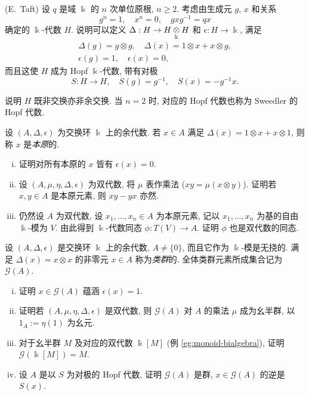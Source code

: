 \begin{Exercises}
	\item (E.\ Taft) 设 $q$ 是域 $\Bbbk$ 的 $n$ 次单位原根, $n \geq 2$. 考虑由生成元 $g$, $x$ 和关系
	\[ g^n = 1, \quad x^n = 0, \quad gxg^{-1} = qx \]
	确定的 $\Bbbk$-代数 $H$. 说明可以定义 $\Delta: H \to H \underset{\Bbbk}{\otimes} H$ 和 $\epsilon: H \to \Bbbk$, 满足
	\begin{gather*}
		\Delta(g) = g \otimes g, \quad \Delta(x) = 1 \otimes x + x \otimes g, \\
		\epsilon(g) = 1, \quad \epsilon(x) = 0,
	\end{gather*}
	而且这使 $H$ 成为 Hopf $\Bbbk$-代数, 带有对极
	\[ S: H \to H, \quad S(g) = g^{-1}, \quad S(x) = -g^{-1}x. \]
	
	说明 $H$ 既非交换亦非余交换. 当 $n=2$ 时, 对应的 Hopf 代数也称为 Sweedler 的 Hopf 代数.

	\item 设 $(A, \Delta, \epsilon)$ 为交换环 $\Bbbk$ 上的余代数. 若 $x \in A$ 满足 $\Delta(x) = 1 \otimes x + x \otimes 1$, 则称 $x$ 是\emph{本原}的.
	\begin{enumerate}[(i)]
		\item 证明对所有本原的 $x$ 皆有 $\epsilon(x) = 0$.
		\item 设 $(A, \mu, \eta, \Delta, \epsilon)$ 为双代数, 将 $\mu$ 表作乘法 ($xy = \mu(x \otimes y)$). 证明若 $x, y \in A$ 是本原元素, 则 $xy - yx$ 亦然.
		\item 仍然设 $A$ 为双代数, 设 $x_1, \ldots, x_n \in A$ 为本原元素, 记以 $x_1, \ldots, x_n$ 为基的自由 $\Bbbk$-模为 $V$. 由此得到 $\Bbbk$-代数同态 $\phi: T(V) \to A$. 证明 $\phi$ 也是双代数的同态.
	\end{enumerate}

	\item 设 $(A, \Delta, \epsilon)$ 是交换环 $\Bbbk$ 上的余代数, $A \neq \{0\}$, 而且它作为 $\Bbbk$-模是无挠的. 满足 $\Delta(x) = x \otimes x$ 的非零元 $x \in A$ 称为\emph{类群}的. 全体类群元素所成集合记为 $\mathcal{G}(A)$.
	\begin{enumerate}[(i)]
		\item 证明 $x \in \mathcal{G}(A)$ 蕴涵 $\epsilon(x) = 1$.
		\item 证明若 $(A, \mu, \eta, \Delta, \epsilon)$ 是双代数, 则 $\mathcal{G}(A)$ 对 $A$ 的乘法 $\mu$ 成为幺半群, 以 $1_A := \eta(1)$ 为幺元.
		\item 对于幺半群 $M$ 及对应的双代数 $\Bbbk[M]$ (例 \ref{eg:monoid-bialgebra}), 证明 $\mathcal{G}(\Bbbk[M]) = M$.
		\item 设 $A$ 是以 $S$ 为对极的 Hopf 代数, 证明 $\mathcal{G}(A)$ 是群, $x \in \mathcal{G}(A)$ 的逆是 $S(x)$.
	\end{enumerate}
	

\end{Exercises}
